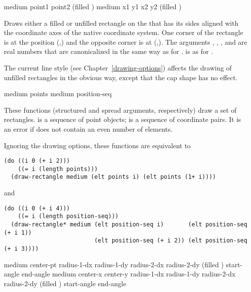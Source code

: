  {medium point1 point2 \key (filled )
                         \DrawingOptions \LineJointOptions}
 {medium x1 y1 x2 y2 \key (filled )
                          \DrawingOptions \LineJointOptions}

Draws either a filled or unfilled rectangle on the   that
has its sides aligned with the coordinate axes of the native coordinate system.
One corner of the rectangle is at the position (,) and the
opposite corner is at (,).  The arguments , ,
, and  are real numbers that are canonicalized in the same way
as for .   is as for .

The current line style (see Chapter~\ref{drawing-options}) affects the drawing
of unfilled rectangles in the obvious way, except that the cap shape has no
effect.


  {medium points \key \DrawingOptions \LineJointOptions}
 {medium position-seq \key \DrawingOptions \LineJointOptions}

These functions (structured and spread arguments, respectively) draw a set of
rectangles.   is a sequence of point objects;  is
a sequence of coordinate pairs.  It is an error if  does not
contain an even number of elements.

Ignoring the drawing options, these functions are equivalent to
\begin{verbatim}
(do ((i 0 (+ i 2)))
    ((= i (length points)))
  (draw-rectangle medium (elt points i) (elt points (1+ i))))
\end{verbatim}
and
\begin{verbatim}
(do ((i 0 (+ i 4)))
    ((= i (length position-seq)))
  (draw-rectangle* medium (elt position-seq i)       (elt position-seq (+ i 1))
                          (elt position-seq (+ i 2)) (elt position-seq (+ i 3))))
\end{verbatim}


  {medium center-pt radius-1-dx radius-1-dy radius-2-dx radius-2-dy
                        \key (filled ) start-angle end-angle
                        \DrawingOptions \LineCapOptions}
 {medium center-x center-y radius-1-dx radius-1-dy radius-2-dx radius-2-dy
                        \key (filled ) start-angle end-angle
                        \DrawingOptions \LineCapOptions}

